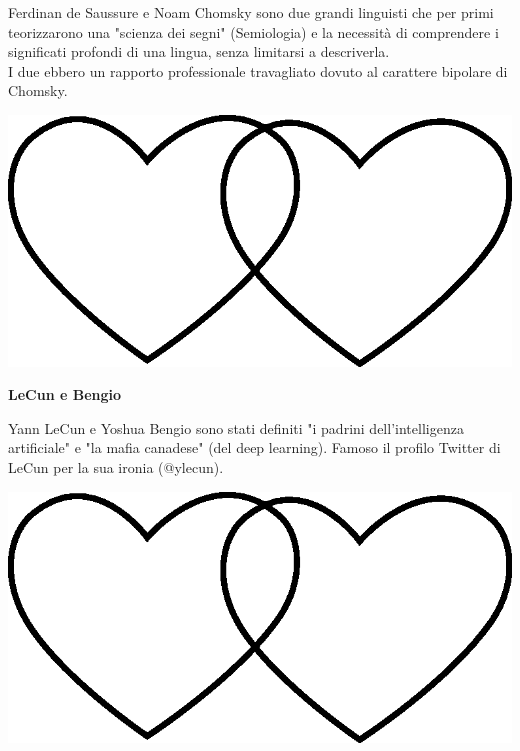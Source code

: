\documentclass[11pt]{extarticle}
\begin{document}
\begin{center}
Ferdinan de Saussure e Noam Chomsky sono due grandi linguisti che per primi teorizzarono una "scienza dei segni" (Semiologia) e la necessità di comprendere i significati profondi di una lingua, senza limitarsi a descriverla.\\I due ebbero un rapporto professionale travagliato dovuto al carattere bipolare di Chomsky.\\
\begin{center}
\includegraphics[scale=0.1]{img/cuori_venn.eps}\\
\end{center}
\end{center}
\vspace*{\fill}
\newpage
\begin{center}
\vspace*{\fill}
{\Huge \textbf{LeCun e Bengio\\}}
\vspace*{\fill}
\end{center}
\newpage
{}
\vspace*{\fill}
\begin{center}
Yann LeCun e Yoshua Bengio sono stati definiti "i padrini dell'intelligenza artificiale" e "la mafia canadese" (del deep learning). Famoso il profilo Twitter di LeCun per la sua ironia (@ylecun).\\
\begin{center}
\includegraphics[scale=0.1]{img/cuori_venn.eps}\\
\end{center}
\end{center}
\end{document}
